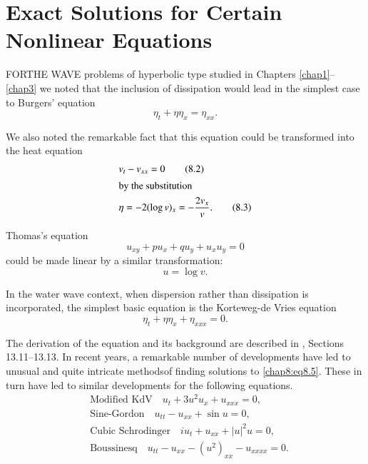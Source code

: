 
\chapter{Exact Solutions for Certain Nonlinear Equations}\label{chap8}

FOR\pageoriginale THE WAVE problems of hyperbolic type studied in Chapters \ref{chap1}--\ref{chap3} we noted that the inclusion of dissipation would lead in the simplest case to Burgers' equation
\begin{equation}
\eta_t+\eta\eta_x=\eta_{xx}.\tag{8.1}\label{chap8:eq8.1}
\end{equation}

We also noted the remarkable fact that this equation could be transformed into the heat equation
\begin{align}
& v_t-v_{xx}=0\tag{8.2}\label{chap8:eq8.2}\\
\intertext{by the substitution}
& \eta=-2(\log v)_x=-\frac{2v_x}{v}.\tag{8.3}\label{chap8:eq8.3}
\end{align}

Thomas's equation 
\begin{equation}
u_{xy}+pu_x+qu_y+u_xu_y=0\tag{8.4}\label{chap8:eq8.4}
\end{equation}
could be made linear by a similar transformation:
$$
u=\log v.
$$

In the water wave context, when dispersion rather than dissipation is incorporated, the simplest basic equation is the Korteweg-de Vries equation 
\begin{equation}
\eta_t+\eta\eta_x+\eta_{xxx}=0.\tag{8.5}\label{chap8:eq8.5}
\end{equation}

The derivation of the equation and its background are described in \cite{key1}, Sections 13.11--13.13. In recent years, a remarkable number of developments have led to unusual and quite intricate methods\pageoriginale of finding solutions to \eqref{chap8:eq8.5}. These in turn have led to similar developments for the following equations.
\begin{align}
&\text{Modified KdV}\quad  u_t+3u^2u_x+u_{xxx}=0,\tag{8.6}\label{chap8:eq8.6}\\
&\text{Sine-Gordon}\quad  u_{tt}-u_{xx}+\sin u=0,\tag{8.7}\label{chap8:eq8.7}\\
&\text{Cubic Schrodinger}\quad  iu_t+u_{xx}+|u|^2u=0, \tag{8.8}\label{chap8:eq8.8}\\
&\text{Boussinesq}\quad  u_{tt}-u_{xx}-(u^2)_{xx}-u_{xxxx}=0. \tag{8.9}\label{chap8:eq8.9}
\end{align}

